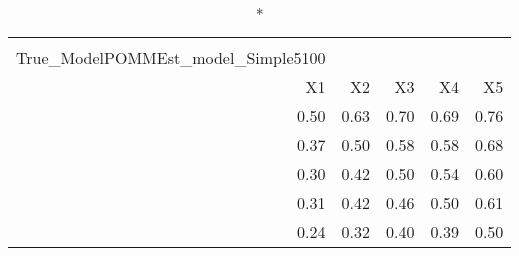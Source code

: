 \begin{longtable}{rrrrr}
\caption*{
{\large Pestmatrix} \\ 
{\small True\_ModelPOMMEst\_model\_Simple5100}
} \\ 
\toprule
X1 & X2 & X3 & X4 & X5 \\ 
\midrule
0.50 & 0.63 & 0.70 & 0.69 & 0.76 \\ 
0.37 & 0.50 & 0.58 & 0.58 & 0.68 \\ 
0.30 & 0.42 & 0.50 & 0.54 & 0.60 \\ 
0.31 & 0.42 & 0.46 & 0.50 & 0.61 \\ 
0.24 & 0.32 & 0.40 & 0.39 & 0.50 \\ 
\bottomrule
\end{longtable}

